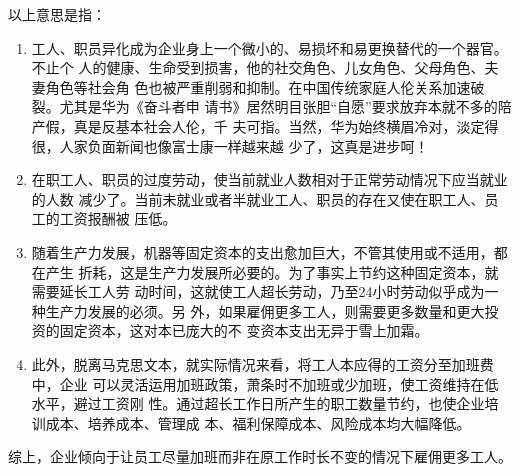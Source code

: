 以上意思是指：
\begin{enumerate}
\item 工人、职员异化成为企业身上一个微小的、易损坏和易更换替代的一个器官。不止个
  人的健康、生命受到损害，他的社交角色、儿女角色、父母角色、夫妻角色等社会角
  色也被严重削弱和抑制。在中国传统家庭人伦关系加速破裂。尤其是华为《奋斗者申
  请书》居然明目张胆“自愿”要求放弃本就不多的陪产假，真是反基本社会人伦，千
  夫可指。当然，华为始终横眉冷对，淡定得很，人家负面新闻也像富士康一样越来越
  少了，这真是进步呵！

\item 在职工人、职员的过度劳动，使当前就业人数相对于正常劳动情况下应当就业的人数
  减少了。当前未就业或者半就业工人、职员的存在又使在职工人、员工的工资报酬被
  压低。

\item 随着生产力发展，机器等固定资本的支出愈加巨大，不管其使用或不适用，都在产生
  折耗，这是生产力发展所必要的。为了事实上节约这种固定资本，就需要延长工人劳
  动时间，这就使工人超长劳动，乃至24小时劳动似乎成为一种生产力发展的必须。另
  外，如果雇佣更多工人，则需要更多数量和更大投资的固定资本，这对本已庞大的不
  变资本支出无异于雪上加霜。

\item 此外，脱离马克思文本，就实际情况来看，将工人本应得的工资分至加班费中，企业
  可以灵活运用加班政策，萧条时不加班或少加班，使工资维持在低水平，避过工资刚
  性。通过超长工作日所产生的职工数量节约，也使企业培训成本、培养成本、管理成
  本、福利保障成本、风险成本均大幅降低。
\end{enumerate}

综上，企业倾向于让员工尽量加班而非在原工作时长不变的情况下雇佣更多工人。





